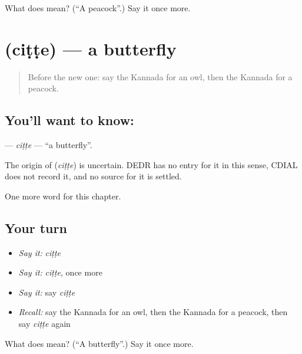 \begin{tcolorbox}[breakable,colback=teal!4,colframe=teal!35!black,title={Before you move on}]
What does  mean? (\textquotedblleft{}A peacock\textquotedblright{}.) Say it once more.
\end{tcolorbox}
\section[\texorpdfstring{\kn{ಚಿಟ್ಟೆ} (ciṭṭe)}{ಚಿಟ್ಟೆ (ciṭṭe)}]{ (ciṭṭe) — a butterfly}

\label{lesson:KA-C132-citte}



\begin{quote}
Before the new one: say the Kannada for an owl, then the Kannada for a peacock.
\end{quote}

\subsection*{You'll want to know: }
\textbf{} — \emph{ciṭṭe} — \textquotedblleft{}a butterfly\textquotedblright{}.

\begin{cousinweb}
The origin of \textbf{} (\emph{ciṭṭe}) is uncertain. DEDR has no entry for it in this sense, CDIAL does not record it, and no source for it is settled.
\end{cousinweb}

\begin{grammarlens}[title={What you've built}]
One more word for this chapter.
\end{grammarlens}

\subsection*{Your turn}
\begin{itemize}
\raggedright
  \item \emph{Say it:} \emph{ciṭṭe}
  \item \emph{Say it:} \emph{ciṭṭe}, once more
  \item \emph{Say it:} say \emph{ciṭṭe}
  \item \emph{Recall:} say the Kannada for an owl, then the Kannada for a peacock, then say \emph{ciṭṭe} again
\end{itemize}

\begin{tcolorbox}[breakable,colback=teal!4,colframe=teal!35!black,title={Before you move on}]
What does  mean? (\textquotedblleft{}A butterfly\textquotedblright{}.) Say it once more.
\end{tcolorbox}
